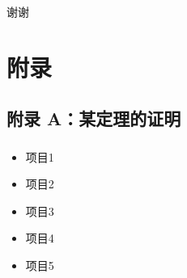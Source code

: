 \documentclass{beamer}
\begin{document}
\begin{frame}
  \frametitle{\subsecname}
  \begin{center}
  \Huge 谢谢
  \end{center}
\end{frame}

\section*{附录}

\subsection*{附录 A：某定理的证明}

\begin{frame}
  \frametitle{\subsecname}
        \begin{itemize}[<+-|alert@+>]
        \item
        项目1
        \item
        项目2
        \item
        项目3
        \item
        项目4
        \item
        项目5
        \end{itemize}
\end{frame}
\end{document}
